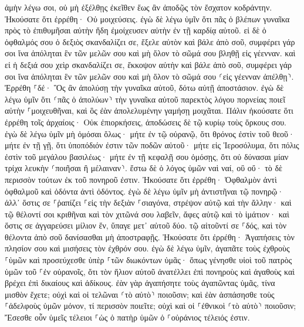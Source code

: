\documentclass[twoside, 9pt]{extreport}
\begin{document}
ἀμὴν λέγω σοι, οὐ μὴ ἐξέλθῃς ἐκεῖθεν ἕως ἂν ἀποδῷς τὸν ἔσχατον κοδράντην. 
Ἠκούσατε ὅτι ἐρρέθη· Οὐ μοιχεύσεις. 
ἐγὼ δὲ λέγω ὑμῖν ὅτι πᾶς ὁ βλέπων γυναῖκα πρὸς τὸ ἐπιθυμῆσαι αὐτὴν ἤδη ἐμοίχευσεν αὐτὴν ἐν τῇ καρδίᾳ αὐτοῦ. 
εἰ δὲ ὁ ὀφθαλμός σου ὁ δεξιὸς σκανδαλίζει σε, ἔξελε αὐτὸν καὶ βάλε ἀπὸ σοῦ, συμφέρει γάρ σοι ἵνα ἀπόληται ἓν τῶν μελῶν σου καὶ μὴ ὅλον τὸ σῶμά σου βληθῇ εἰς γέενναν. 
καὶ εἰ ἡ δεξιά σου χεὶρ σκανδαλίζει σε, ἔκκοψον αὐτὴν καὶ βάλε ἀπὸ σοῦ, συμφέρει γάρ σοι ἵνα ἀπόληται ἓν τῶν μελῶν σου καὶ μὴ ὅλον τὸ σῶμά σου ⸂εἰς γέενναν ἀπέλθῃ⸃. 
Ἐρρέθη ⸀δέ· Ὃς ἂν ἀπολύσῃ τὴν γυναῖκα αὐτοῦ, δότω αὐτῇ ἀποστάσιον. 
ἐγὼ δὲ λέγω ὑμῖν ὅτι ⸂πᾶς ὁ ἀπολύων⸃ τὴν γυναῖκα αὐτοῦ παρεκτὸς λόγου πορνείας ποιεῖ αὐτὴν ⸀μοιχευθῆναι, καὶ ὃς ἐὰν ἀπολελυμένην γαμήσῃ μοιχᾶται. 
Πάλιν ἠκούσατε ὅτι ἐρρέθη τοῖς ἀρχαίοις· Οὐκ ἐπιορκήσεις, ἀποδώσεις δὲ τῷ κυρίῳ τοὺς ὅρκους σου. 
ἐγὼ δὲ λέγω ὑμῖν μὴ ὀμόσαι ὅλως· μήτε ἐν τῷ οὐρανῷ, ὅτι θρόνος ἐστὶν τοῦ θεοῦ· 
μήτε ἐν τῇ γῇ, ὅτι ὑποπόδιόν ἐστιν τῶν ποδῶν αὐτοῦ· μήτε εἰς Ἱεροσόλυμα, ὅτι πόλις ἐστὶν τοῦ μεγάλου βασιλέως· 
μήτε ἐν τῇ κεφαλῇ σου ὀμόσῃς, ὅτι οὐ δύνασαι μίαν τρίχα λευκὴν ⸂ποιῆσαι ἢ μέλαιναν⸃. 
ἔστω δὲ ὁ λόγος ὑμῶν ναὶ ναί, οὒ οὔ· τὸ δὲ περισσὸν τούτων ἐκ τοῦ πονηροῦ ἐστιν. 
Ἠκούσατε ὅτι ἐρρέθη· Ὀφθαλμὸν ἀντὶ ὀφθαλμοῦ καὶ ὀδόντα ἀντὶ ὀδόντος. 
ἐγὼ δὲ λέγω ὑμῖν μὴ ἀντιστῆναι τῷ πονηρῷ· ἀλλ᾽ ὅστις σε ⸀ῥαπίζει ⸀εἰς τὴν δεξιὰν ⸀σιαγόνα, στρέψον αὐτῷ καὶ τὴν ἄλλην· 
καὶ τῷ θέλοντί σοι κριθῆναι καὶ τὸν χιτῶνά σου λαβεῖν, ἄφες αὐτῷ καὶ τὸ ἱμάτιον· 
καὶ ὅστις σε ἀγγαρεύσει μίλιον ἕν, ὕπαγε μετ᾽ αὐτοῦ δύο. 
τῷ αἰτοῦντί σε ⸀δός, καὶ τὸν θέλοντα ἀπὸ σοῦ δανίσασθαι μὴ ἀποστραφῇς. 
Ἠκούσατε ὅτι ἐρρέθη· Ἀγαπήσεις τὸν πλησίον σου καὶ μισήσεις τὸν ἐχθρόν σου. 
ἐγὼ δὲ λέγω ὑμῖν, ἀγαπᾶτε τοὺς ἐχθροὺς ⸀ὑμῶν καὶ προσεύχεσθε ὑπὲρ ⸀τῶν διωκόντων ὑμᾶς· 
ὅπως γένησθε υἱοὶ τοῦ πατρὸς ὑμῶν τοῦ ⸀ἐν οὐρανοῖς, ὅτι τὸν ἥλιον αὐτοῦ ἀνατέλλει ἐπὶ πονηροὺς καὶ ἀγαθοὺς καὶ βρέχει ἐπὶ δικαίους καὶ ἀδίκους. 
ἐὰν γὰρ ἀγαπήσητε τοὺς ἀγαπῶντας ὑμᾶς, τίνα μισθὸν ἔχετε; οὐχὶ καὶ οἱ τελῶναι ⸂τὸ αὐτὸ⸃ ποιοῦσιν; 
καὶ ἐὰν ἀσπάσησθε τοὺς ⸀ἀδελφοὺς ὑμῶν μόνον, τί περισσὸν ποιεῖτε; οὐχὶ καὶ οἱ ⸀ἐθνικοὶ ⸂τὸ αὐτὸ⸃ ποιοῦσιν; 
Ἔσεσθε οὖν ὑμεῖς τέλειοι ⸀ὡς ὁ πατὴρ ὑμῶν ὁ ⸀οὐράνιος τέλειός ἐστιν. 
\end{document}
